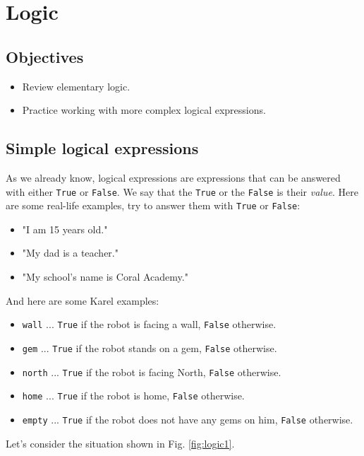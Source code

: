 
\section{Logic} \label{sec:logic} 

\subsection[\ \ Objectives]{Objectives} 
 
\begin{itemize}
\item Review elementary logic.
\item Practice working with more complex logical expressions.
\end{itemize}

\subsection[\ \ Simple logical expressions]{Simple logical expressions}

As we already know, logical expressions are expressions that can be answered with either {\tt True} or 
{\tt False}. We say that the {\tt True} or the {\tt False} is their {\em value}. Here are some 
real-life examples, try to answer them with {\tt True} or {\tt False}:

\begin{itemize}
\item "I am 15 years old."
\item "My dad is a teacher."
\item "My school's name is Coral Academy."
\end{itemize}
And here are some Karel examples:
\begin{itemize}
\item {\color{ForestGreen} \tt wall} ... {\tt True} if the robot is facing a wall, {\tt False} otherwise.
\item {\color{ForestGreen} \tt gem}  ... {\tt True} if the robot stands on a gem, {\tt False} otherwise.
\item {\color{ForestGreen} \tt north} ... {\tt True} if the robot is facing North, {\tt False} otherwise.
\item {\color{ForestGreen} \tt home} ... {\tt True} if the robot is home, {\tt False} otherwise.
\item {\color{ForestGreen} \tt empty} ... {\tt True} if the robot does not have any gems on him, {\tt False} otherwise.
\end{itemize}
Let's consider the situation shown in Fig. \ref{fig:logic1}.
\newpage

